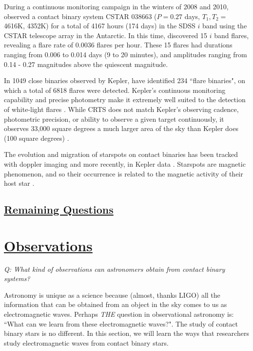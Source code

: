 \documentclass[12pt]{article} %
\numberwithin{equation}{section} %
\begin{document}
During a continuous monitoring campaign in the winters of 2008 and 2010, \citet{qian2014optical} observed a contact binary system CSTAR 038663 ($P = 0.27$ days, $T_{1}, T_{2} =$ 4616K, 4352K) for a total of 4167 hours (174 days) in the SDSS $i$ band using the CSTAR telescope array in the Antarctic. In this time, \citet{qian2014optical} discovered 15 $i$ band flares, revealing a flare rate of $0.0036$ flares per hour. These 15 flares had durations ranging from 0.006 to 0.014 days (9 to 20 minutes), and amplitudes ranging from 0.14 - 0.27 magnitudes above the quiescent magnitude.

In 1049 close binaries observed by Kepler, \citet{gao2016white} have identified 234 ``flare binaries", on which a total of 6818 flares were detected. Kepler's continuous monitoring capability and precise photometry make it extremely well suited to the detection of white-light flares \citep{walkowicz2011white}. While CRTS does not match Kepler's observing cadence, photometric precision, or ability to observe a given target continuously, it observes 33,000 square degrees a much larger area of the sky than Kepler does (100 square degrees) \citep{drake2009first, basri2005kepler}.

The evolution and migration of starspots on contact binaries has been tracked with doppler imaging \citep{hendry2000doppler} and more recently, in Kepler data \citep{tran2013anticorrelated, balaji2015tracking}. Starspots are magnetic phenomenon, and so their occurrence is related to the magnetic activity of their host star \citep{berdyugina2005starspots}.  

\subsection[Remaining Questions]{\hyperlink{toc}{Remaining Questions}} \label{sec: Remaining Questions}

\section[Observations]{\hyperlink{toc}{Observations}} \label{sec: observations}

\emph{Q: What kind of observations can astronomers obtain from contact binary systems?}

Astronomy is unique as a science because (almost, thanks LIGO) all the information that can be obtained from an object in the sky comes to us as electromagnetic waves. Perhaps \emph{THE} question in observational astronomy is: ``What can we learn from these electromagnetic waves?". The study of contact binary stars is no different. In this section, we will learn the ways that researchers study electromagnetic waves from contact binary stars.
\end{document}
